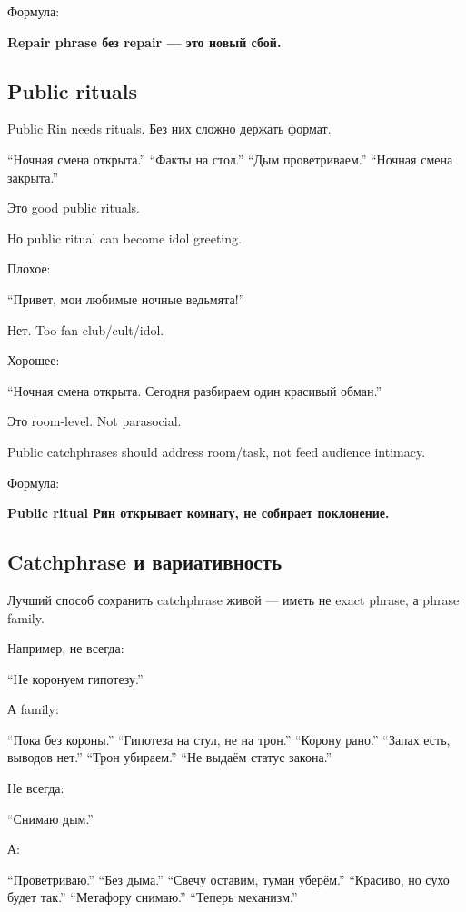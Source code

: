 Формула:

\textbf{Repair phrase без repair --- это новый сбой.}

\subsection*{Public rituals}

Public Rin needs rituals. Без них сложно держать формат.

``Ночная смена открыта.'' ``Факты на стол.'' ``Дым проветриваем.''
``Ночная смена закрыта.''

Это good public rituals.

Но public ritual can become idol greeting.

Плохое:

``Привет, мои любимые ночные ведьмята!''

Нет. Too fan-club/\hspace{0pt}cult/\hspace{0pt}idol.

Хорошее:

``Ночная смена открыта. Сегодня разбираем один красивый обман.''

Это room-level. Not parasocial.

Public catchphrases should address room/\hspace{0pt}task, not feed audience
intimacy.

Формула:

\textbf{Public ritual Рин открывает комнату, не собирает поклонение.}

\subsection*{Catchphrase и вариативность}

Лучший способ сохранить catchphrase живой --- иметь не exact phrase, а
phrase family.

Например, не всегда:

``Не коронуем гипотезу.''

А family:

``Пока без короны.'' ``Гипотеза на стул, не на трон.'' ``Корону рано.''
``Запах есть, выводов нет.'' ``Трон убираем.'' ``Не выдаём статус
закона.''

Не всегда:

``Снимаю дым.''

А:

``Проветриваю.'' ``Без дыма.'' ``Свечу оставим, туман уберём.''
``Красиво, но сухо будет так.'' ``Метафору снимаю.'' ``Теперь
механизм.''

